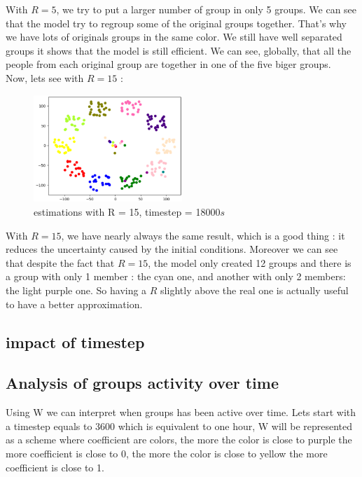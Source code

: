 \documentclass{article}
\begin{document}
With $R = 5$, we try to put a larger number of group in only 5 groups. We can see that the model try to regroup some of the original groups
together. That's why we have lots of originals groups in the same color. We still have well separated groups it shows that
the model is still efficient. We can see, globally, that all the people from each original group are together in one of the five biger groups.\\

Now, lets see with $R = 15$ :

\begin{figure}[H]
    \centering
    \includegraphics[width=0.5\textwidth]{images/R=15_t=18000.png}
    \caption{estimations with R = 15, timestep = 18000$s$}
\end{figure}

With $R = 15$, we have nearly always the same result, which is a good thing : it reduces the uncertainty caused by the initial conditions.
Moreover we can see that despite the fact that $R = 15$, the model only created 12 groups and there is a group with only 1 member : the cyan one, and another with only
2 members: the light purple one. So having a $R$ slightly above the real one is actually useful to have a better approximation.

\subsection{impact of timestep}

\subsection{Analysis of groups activity over time}

Using W we can interpret when groups has been active over time. Lets start with a timestep equals to 3600 which is equivalent to one hour,
W will be represented as a scheme where coefficient are colors, the more the color is close to purple the more coefficient is close to 0, the more
the color is close to yellow the more coefficient is close to 1.
\end{document}
